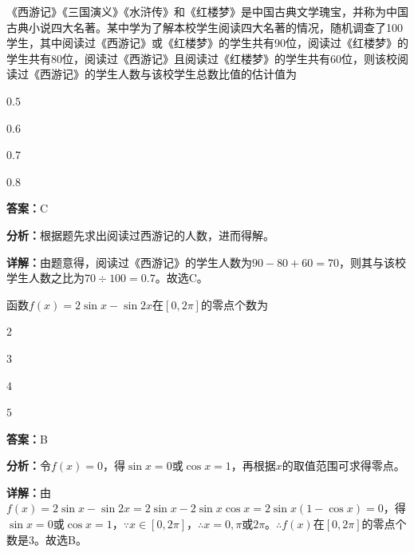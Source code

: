 \begin{question}[points=5]
《西游记》《三国演义》《水浒传》和《红楼梦》是中国古典文学瑰宝，并称为中国古典小说四大名著。某中学为了解本校学生阅读四大名著的情况，随机调查了100学生，其中阅读过《西游记》或《红楼梦》的学生共有90位，阅读过《红楼梦》的学生共有80位，阅读过《西游记》且阅读过《红楼梦》的学生共有60位，则该校阅读过《西游记》的学生人数与该校学生总数比值的估计值为
\begin{choices}
  \item $0.5$
  \item $0.6$
  \item $0.7$
  \item $0.8$
\end{choices}
\begin{solution}
\textbf{答案：}C

\textbf{分析：}根据题先求出阅读过西游记的人数，进而得解。

\textbf{详解：}由题意得，阅读过《西游记》的学生人数为$90-80+60=70$，则其与该校学生人数之比为$70\div100=0.7$。故选C。
\end{solution}
\end{question}

\begin{question}[points=5]
函数$f(x)=2\sin x-\sin 2x$在$[0,2\pi]$的零点个数为
\begin{choices}
  \item $2$
  \item $3$
  \item $4$
  \item $5$
\end{choices}
\begin{solution}
\textbf{答案：}B

\textbf{分析：}令$f(x)=0$，得$\sin x=0$或$\cos x=1$，再根据$x$的取值范围可求得零点。

\textbf{详解：}由$f(x)=2\sin x-\sin2x=2\sin x-2\sin x\cos x=2\sin x(1-\cos x)=0$，得$\sin x=0$或$\cos x=1$，$\because x\in[0,2\pi]$，$\therefore x=0,\pi$或$2\pi$。$\therefore f(x)$在$[0,2\pi]$的零点个数是3。故选B。
\end{solution}
\end{question}


